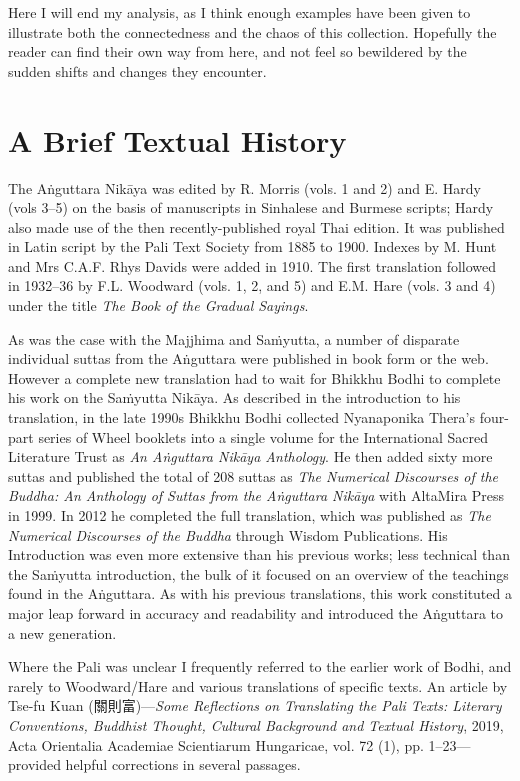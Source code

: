 \documentclass[12pt,openany]{book}%
\begin{document}
Here I will end my analysis, as I think enough examples have been given to illustrate both the connectedness and the chaos of this collection. Hopefully the reader can find their own way from here, and not feel so bewildered by the sudden shifts and changes they encounter.

\section*{A Brief Textual History}

The \textsanskrit{Aṅguttara} \textsanskrit{Nikāya} was edited by R. Morris (vols. 1 and 2) and E. Hardy (vols 3–5) on the basis of manuscripts in Sinhalese and Burmese scripts; Hardy also made use of the then recently-published royal Thai edition. It was published in Latin script by the Pali Text Society from 1885 to 1900. Indexes by M. Hunt and Mrs C.A.F. Rhys Davids were added in 1910. The first translation followed in 1932–36 by F.L. Woodward (vols. 1, 2, and 5) and E.M. Hare (vols. 3 and 4) under the title \textit{The Book of the Gradual Sayings}.

As was the case with the Majjhima and \textsanskrit{Saṁyutta}, a number of disparate individual suttas from the \textsanskrit{Aṅguttara} were published in book form or the web. However a complete new translation had to wait for Bhikkhu Bodhi to complete his work on the \textsanskrit{Saṁyutta} \textsanskrit{Nikāya}. As described in the introduction to his translation, in the late 1990s Bhikkhu Bodhi collected Nyanaponika Thera’s four-part series of Wheel booklets into a single volume for the International Sacred Literature Trust as \textit{An \textsanskrit{Aṅguttara} \textsanskrit{Nikāya} Anthology}. He then added sixty more suttas and published the total of 208 suttas as \textit{The Numerical Discourses of the Buddha: An Anthology of Suttas from the \textsanskrit{Aṅguttara} \textsanskrit{Nikāya}} with AltaMira Press in 1999. In 2012 he completed the full translation, which was published as \textit{The Numerical Discourses of the Buddha} through Wisdom Publications. His Introduction was even more extensive than his previous works; less technical than the \textsanskrit{Saṁyutta} introduction, the bulk of it focused on an overview of the teachings found in the \textsanskrit{Aṅguttara}. As with his previous translations, this work constituted a major leap forward in accuracy and readability and introduced the \textsanskrit{Aṅguttara} to a new generation.

Where the Pali was unclear I frequently referred to the earlier work of Bodhi, and rarely to Woodward/Hare and various translations of specific texts. An article by Tse-fu Kuan (關則富)—\textit{Some Reflections on Translating the Pali Texts: Literary Conventions, Buddhist Thought, Cultural Background and Textual History}, 2019, Acta Orientalia Academiae Scientiarum Hungaricae, vol. 72 (1), pp. 1–23—provided helpful corrections in several passages.
\end{document}
